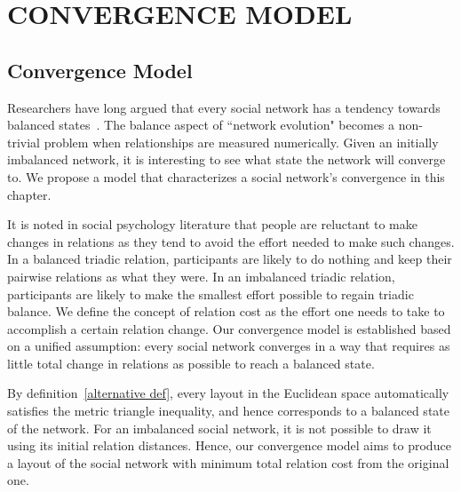  



\chapter{CONVERGENCE MODEL} \label{sec:mathmodel}
\section{Convergence Model}
Researchers have long argued that every social network has a tendency
towards balanced states~\cite{Doreian:02}. The balance aspect of ``network evolution" becomes a non-trivial problem when relationships are measured numerically. Given an initially imbalanced network, it is interesting to see what state the network will converge to. We propose a model that characterizes a social network's convergence in this chapter.

It is noted in social psychology literature that people are reluctant
to make changes in relations as they tend to avoid the effort needed to
make such changes. In a balanced triadic relation, participants are
likely to do nothing and keep their pairwise relations as what they
were. In an imbalanced triadic relation, participants are likely to
make the smallest effort possible to regain triadic balance. We define
the concept of relation cost as the effort one needs to take to
accomplish a certain relation change. Our convergence model is
established based on a unified assumption: every social network
converges in a way that requires as little total change in relations
as possible to reach a balanced state.

By definition~\ref{alternative def}, every layout in the Euclidean
space automatically satisfies the metric triangle inequality, and
hence corresponds to a balanced state of the network.  For an
imbalanced social network, it is not possible to draw it using its
initial relation distances.  Hence, our convergence model aims to
produce a layout of the social network with minimum total relation
cost from the original one.

